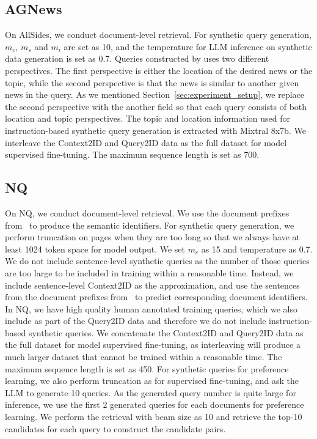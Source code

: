 \subsection{AGNews}
On AllSides, we conduct document-level retrieval. For synthetic query generation, $m_c$, $m_s$ and $m_i$ are set as 10, and the temperature for LLM inference on synthetic data generation is set as 0.7. Queries constructed by \citet{DBLP:journals/corr/abs-2405-02714} uses two different perspectives. The first perspective is either the location of the desired news or the topic, while the second perspective is that the news is similar to another given news in the query. As we mentioned Section~\ref{sec:experiment_setup}, we replace the second perspective with the another field so that each query consists of both location and topic perspectives. The topic and location information used for instruction-based synthetic query generation is extracted with Mixtral 8x7b. We interleave the Context2ID and Query2ID data as the full dataset for model supervised fine-tuning. The maximum sequence length is set as 700.
\subsection{NQ}
On NQ, we conduct document-level retrieval. We use the document prefixes from~\cite{DBLP:conf/icml/KishoreWLAW23} to produce the semantic identifiers. For synthetic query generation, we perform truncation on pages when they are too long so that we always have at least 1024 token space for model output. We set $m_c$ as 15 and temperature as 0.7. We do not include sentence-level synthetic queries as the number of those queries are too large to be included in training within a reasonable time. Instead, we include sentence-level Context2ID as the approximation, and use the sentences from the document prefixes from~\cite{DBLP:conf/icml/KishoreWLAW23} to predict corresponding document identifiers. In NQ, we have high quality human annotated training queries, which we also include as part of the Query2ID data and therefore we do not include instruction-based synthetic queries. We concatenate the Context2ID and Query2ID data as the full dataset for model supervised fine-tuning, as interleaving will produce a much larger dataset that cannot be trained within a reasonable time. The maximum sequence length is set as 450. For synthetic queries for preference learning, we also perform truncation as for supervised fine-tuning, and ask the LLM to generate 10 queries. As the generated query number is quite large for inference, we use the first 2 generated queries for each documents for preference learning. We perform the retrieval with beam size as 10 and retrieve the top-10 candidates for each query to construct the candidate pairs.
